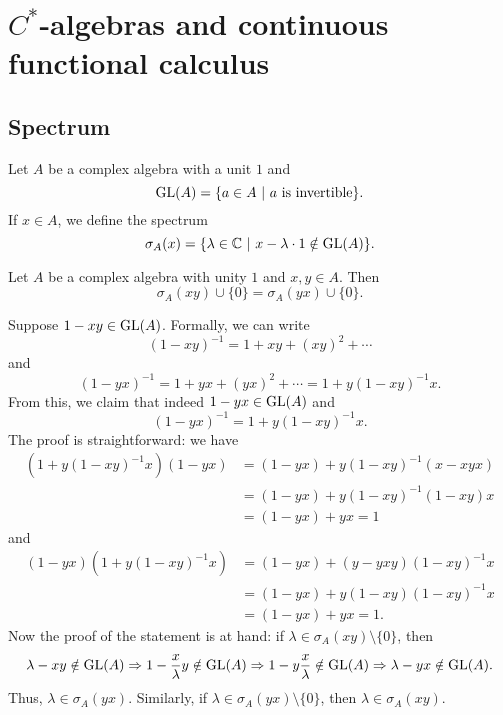 \section{$C^*$-algebras and continuous functional calculus}

\subsection{Spectrum}

Let $A$ be a complex algebra with a unit $1$ and 
$$\operatorname{GL} (A) = \{a \in A\ |\ \textrm{$a$ is invertible}\}.$$
If $x \in A$, we define the spectrum 
$$\sigma_A (x) = \{\lambda \in \mathbb {C}\ |\ x - \lambda \cdot 1 \notin \operatorname{GL}(A)\}.$$
\begin{proposition}\label{prop:2.1}
  Let $A$ be a complex algebra with unity $1$ and $x, y \in A$. Then 
  $$\sigma_A (xy) \cup \{0\} = \sigma_A (yx) \cup \{0\}.$$
\end{proposition}

\begin{myproof}
  Suppose $1 - xy \in \operatorname{GL}(A)$. Formally, we can write 
  $$(1 - xy)^{-1} = 1 + xy + (xy)^2 + \cdots$$
  and $$(1 - yx)^{-1} = 1 + yx + (yx)^2 + \cdots = 1 + y(1 - xy)^{-1} x.$$
  From this, we claim that indeed $1 - yx \in \operatorname{GL} (A)$ and 
  $$(1 - yx)^{-1} = 1 + y(1 - xy)^{-1} x.$$ 
  The proof is straightforward: we have
  \begin{align*}
    (1 + y(1 - xy)^{-1} x)(1 - yx) &= (1 - yx) + y(1 - xy)^{-1} (x - xyx)\\
    &= (1 - yx) + y (1 - xy)^{-1} (1 - xy) x\\
    &= (1 - yx) + yx = 1
  \end{align*} 
  and 
  \begin{align*}
    (1 - yx) (1 + y(1 - xy)^{-1} x) &= (1 - yx) + (y - yxy) (1 - xy)^{-1} x\\
    &= (1 - yx) + y(1 - xy) (1 - xy)^{-1} x\\
    &= (1 - yx) + yx = 1.
  \end{align*}
  Now the proof of the statement is at hand: if $\lambda \in \sigma_A (xy) \setminus \{0\}$,
  then \begin{align*}
    \lambda - xy \notin \operatorname{GL} (A) \Rightarrow 1 - \frac{x}{\lambda} y \notin \operatorname{GL} (A) \Rightarrow 1 - y \frac{x}{\lambda} \notin \operatorname{GL} (A) \Rightarrow \lambda - yx \notin \operatorname{GL} (A).
  \end{align*}
  Thus, $\lambda \in \sigma_A (yx)$.
  Similarly, if $\lambda \in \sigma_A (yx) \setminus \{0\}$, then $\lambda \in \sigma_A (xy)$.
\end{myproof}

